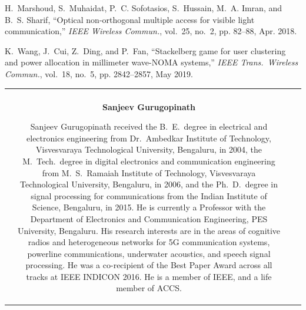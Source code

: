 \begin{multicols}{2}
\begin{thebibliography}{99}
H.~{Marshoud}, S.~{Muhaidat}, P.~C. {Sofotasios}, S.~{Hussain}, M.~A. {Imran},
  and B.~S. {Sharif}, ``Optical non-orthogonal multiple access for visible
  light communication,'' \emph{{IEEE} Wireless Commun.}, vol.~25, no.~2, pp.
  82--88, Apr. 2018.

K.~{Wang}, J.~{Cui}, Z.~{Ding}, and P.~{Fan}, ``Stackelberg game for user
  clustering and power allocation in millimeter wave-{NOMA} systems,''
  \emph{IEEE Trans.\ Wireless Commun.}, vol.~18, no.~5, pp. 2842--2857, May
  2019.
\end{thebibliography}
\end{multicols}

\vskip 1cm


\noindent
\begin{tabular}{V{2.5}cp{14.5cm}V{2.5}}
 &\\

 & 

\centerline{\large\bf Sanjeev Gurugopinath}

\bigskip
Sanjeev Gurugopinath received the B.~E.~degree in electrical and electronics engineering from Dr.~Ambedkar Institute of Technology, Visvesvaraya Technological University, Bengaluru, in 2004, the M.~Tech.~degree in digital electronics and communication engineering from  M.~S.~Ramaiah Institute of Technology, Visvesvaraya Technological University, Bengaluru, in 2006, and the Ph.~D.~degree in signal processing for communications from the Indian Institute of Science, Bengaluru, in 2015. He is currently a Professor with the Department of Electronics and Communication Engineering, PES University, Bengaluru. His research interests are in the areas of cognitive radios and heterogeneous networks for 5G communication systems, powerline communications, underwater acoustics, and speech signal processing. He was a co-recipient of the Best Paper Award across all tracks at IEEE INDICON 2016. He is a member of IEEE, and a life member of ACCS.\\


\end{tabular}
